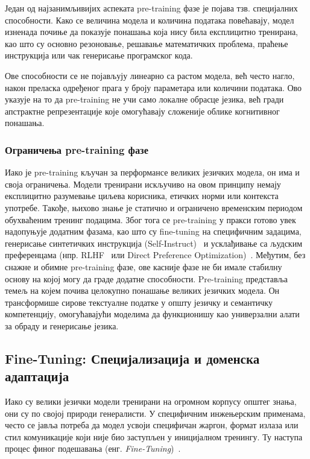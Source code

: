 Један од најзанимљивијих аспеката pre-training фазе је појава тзв. специјалних способности. Како се величина модела и количина података повећавају, модел изненада почиње да показује понашања која нису била експлицитно тренирана, као што су основно резоновање, решавање математичких проблема, праћење инструкција или чак генерисање програмског кода.

Ове способности се не појављују линеарно са растом модела, већ често нагло, након преласка одређеног прага у броју параметара или количини података. Ово указује на то да pre-training не учи само локалне обрасце језика, већ гради апстрактне репрезентације које омогућавају сложеније облике когнитивног понашања.

\subsubsection{Ограничења pre-training фазе}

Иако је pre-training кључан за перформансе великих језичких модела, он има и своја ограничења. Модели тренирани искључиво на овом принципу немају експлицитно разумевање циљева корисника, етичких норми или контекста употребе. Такође, њихово знање је статично и ограничено временским периодом обухваћеним тренинг подацима.
Због тога се pre-training у пракси готово увек надопуњује додатним фазама, као што су fine-tuning на специфичним задацима, генерисање синтетичких инструкција (Self-Instruct)~\cite{wang2023selfinstruct} и усклађивање са људским преференцама (нпр. RLHF~\cite{ouyang2022,bai2022} или Direct Preference Optimization)~\cite{rafailov2023dpo}. Међутим, без снажне и обимне pre-training фазе, ове касније фазе не би имале стабилну основу на којој могу да граде додатне способности.
Pre-training представља темељ на којем почива целокупно понашање великих језичких модела. Он трансформише сирове текстуалне податке у општу језичку и семантичку компетенцију, омогућавајући моделима да функционишу као универзални алати за обраду и генерисање језика.

\subsection{Fine-Tuning: Специјализација и доменска адаптација}

Иако су велики језички модели тренирани на огромном корпусу општег знања, они су по својој природи генералисти. У специфичним инжењерским применама, често се јавља потреба да модел усвоји специфичан жаргон, формат излаза или стил комуникације који није био заступљен у иницијалном тренингу. Ту наступа процес финог подешавања (енг. \textit{Fine-Tuning})~\cite{ouyang2022,hu2022lora}.

